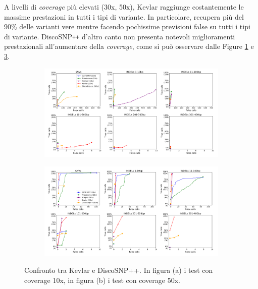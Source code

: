 \documentclass[../main.tex]{subfiles}
\begin{document}
A livelli di \textit{coverage} più elevati (30x, 50x), Kevlar raggiunge costantemente le massime prestazioni in tutti i tipi di variante. In particolare, recupera più del $90\%$ delle varianti vere mentre facendo pochissime previsioni false su tutti i tipi di variante. DiscoSNP\texttt{++} d'altro canto non presenta notevoli miglioramenti prestazionali all'aumentare della \textit{coverage}, come si può osservare dalle Figure \ref{fig:kd10} e \ref{fig:kd50}.

\begin{figure}[h!]
	\centering
	\begin{subfigure}{.5\textwidth}
	  \centering
	  \includegraphics[width=\linewidth]{images/confronto_kevlar_disco_10.png}
	  \caption{}
	  \label{fig:kd10}
	\end{subfigure}%
	\begin{subfigure}{.5\textwidth}
	  \centering
	  \includegraphics[width=\linewidth]{images/confronto_kevlar_disco_50.png}
	  \caption{}	  
	  \label{fig:kd50}
	\end{subfigure}
	\caption{Confronto tra Kevlar e DiscoSNP++. In figura (a) i test con coverage 10x, in figura (b) i test con coverage 50x.}
\end{figure}
\end{document}
